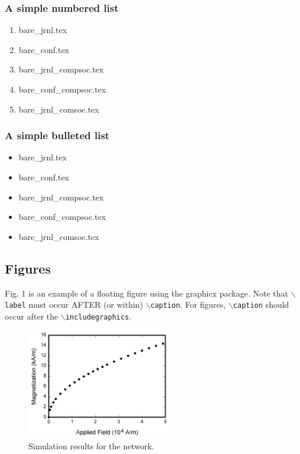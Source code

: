 \documentclass[lettersize,journal]{IEEEtran}
\begin{document}
\subsubsection*{\bf A simple numbered list}
\begin{enumerate}
  \item{bare\_jrnl.tex}
  \item{bare\_conf.tex}
  \item{bare\_jrnl\_compsoc.tex}
  \item{bare\_conf\_compsoc.tex}
  \item{bare\_jrnl\_comsoc.tex}
\end{enumerate}

\subsubsection*{\bf A simple bulleted list}
\begin{itemize}
  \item{bare\_jrnl.tex}
  \item{bare\_conf.tex}
  \item{bare\_jrnl\_compsoc.tex}
  \item{bare\_conf\_compsoc.tex}
  \item{bare\_jrnl\_comsoc.tex}
\end{itemize}

\subsection{Figures}
Fig. 1 is an example of a floating figure using the graphicx package. Note that
$\backslash${\tt{label}} must occur AFTER (or within)
$\backslash${\tt{caption}}. For figures, $\backslash${\tt{caption}} should
occur after the $\backslash${\tt{includegraphics}}.

\begin{figure}[!t]
  \centering
  \includegraphics[width=2.5in]{fig1}
  \caption{Simulation results for the network.}
  \label{fig_1}
\end{figure}
\end{document}
